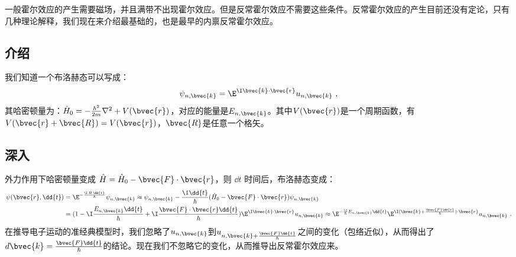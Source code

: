 \begin{issues}
\issueDraft
\end{issues}
一般霍尔效应的产生需要磁场，并且满带不出现霍尔效应。但是反常霍尔效应不需要这些条件。反常霍尔效应的产生目前还没有定论，只有几种理论解释，我们现在来介绍最基础的，也是最早的内禀反常霍尔效应。
\subsection{介绍}
我们知道一个布洛赫态可以写成：
\begin{equation}
\psi_{n,\bvec{k}}=\E^{\I\bvec{k}\cdot\bvec{r}}u_{n,\bvec{k}}~,
\end{equation}
其哈密顿量为：$\hat H_0=-\frac{\hbar^2}{2m}\nabla^2+V(\bvec{r})$，对应的能量是$E_{n,\bvec{k}}$。其中$V(\bvec{r})$是一个周期函数，有$V(\bvec{r}+\bvec{R})=V(\bvec{r})$，$\bvec{R}$是任意一个格矢。

\subsection{深入}
外力作用下哈密顿量变成 $\hat H =\hat H_0 -\bvec{F}\cdot\bvec{r}$，则 $\dd{t}$ 时间后，布洛赫态变成：
\begin{equation}
\begin{aligned}
\psi(\bvec{r},\dd{t})&=\E^{-\frac{\I\,\hat H\,\dd{t}}{\hbar}}\psi_{n,\bvec{k}} \approx \psi_{n,\bvec{k}}-\frac{\I\dd{t}}{\hbar}(\hat H_0 -\bvec{F}\cdot\bvec{r})\psi_{n,\bvec{k}}\\
&=(1-\I \frac{E_{n,\bvec{k}}\dd{t}}{\hbar}+\I\frac{\bvec{F}\cdot\bvec{r}\dd{t}}{\hbar})\E^{\I\bvec{k}\cdot\bvec{r}}u_{n,\bvec{k}}
\approx \E^{-\frac{\I}{\hbar}E_{n,\bvec{k}}\dd{t}}\E^{\I(\bvec{k}+\frac{\bvec{F}\dd{t}}{\hbar})\cdot \bvec{r}}u_{n,\bvec{k}}~.
\end{aligned}
\end{equation}
在推导电子运动的准经典模型时，我们忽略了$u_{n,\bvec{k}}$到$u_{n,\bvec{k}+\frac{\bvec{F}\dd{t}}{\hbar}}$之间的变化（包络近似），从而得出了$d\bvec{k}=\frac{\bvec{F}\dd{t}}{\hbar}$的结论。现在我们不忽略它的变化，从而推导出反常霍尔效应来。

